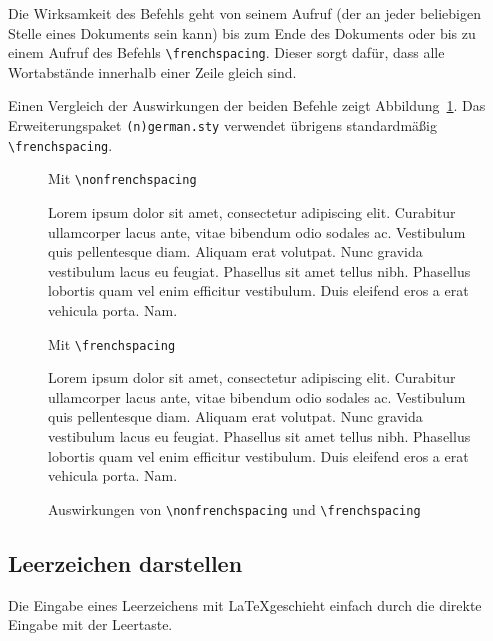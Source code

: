 \documentclass[a4paper,10pt,twoside]{scrbook}
\begin{document}
Die Wirksamkeit des Befehls geht von seinem Aufruf (der an jeder beliebigen Stelle eines Dokuments sein kann) bis zum Ende des Dokuments oder bis zu einem 
Aufruf des Befehls \verb!\frenchspacing!. Dieser sorgt 
dafür, dass alle Wortabstände innerhalb einer Zeile gleich sind. 


Einen Vergleich der Auswirkungen der beiden Befehle zeigt Abbildung~\ref{Abbildungen_frenchspacing_nonfrenchspacing}.
Das Erweiterungspaket \verb!(n)german.sty! verwendet übrigens standardmäßig \verb!\frenchspacing!.

\begin{figure}[H]
\begin{minipage}[t]{0.48\textwidth}
\setlength{\parskip}{1em}
Mit \verb!\nonfrenchspacing!

\nonfrenchspacing 
Lorem ipsum dolor sit amet, consectetur adipiscing elit. Curabitur ullamcorper lacus ante, vitae bibendum odio sodales ac. Vestibulum quis pellentesque diam. Aliquam erat volutpat. Nunc gravida vestibulum lacus eu feugiat. Phasellus sit amet tellus nibh. Phasellus lobortis quam vel enim efficitur vestibulum. Duis eleifend eros a erat vehicula porta. Nam.
\end{minipage}
\hfill
\begin{minipage}[t]{0.48\textwidth}
\setlength{\parskip}{1em}
Mit \verb!\frenchspacing!

\frenchspacing
Lorem ipsum dolor sit amet, consectetur adipiscing elit. Curabitur ullamcorper lacus ante, vitae bibendum odio sodales ac. Vestibulum quis pellentesque diam. Aliquam erat volutpat. Nunc gravida vestibulum lacus eu feugiat. Phasellus sit amet tellus nibh. Phasellus lobortis quam vel enim efficitur vestibulum. Duis eleifend eros a erat vehicula porta. Nam.
\end{minipage}
\caption{Auswirkungen von \texttt{\textbackslash nonfrenchspacing} und \texttt{\textbackslash frenchspacing}}
\label{Abbildungen_frenchspacing_nonfrenchspacing}
\end{figure}


\subsection{Leerzeichen darstellen}

Die Eingabe eines Leerzeichens mit \LaTeX geschieht einfach durch die 
direkte Eingabe mit der Leertaste. 
\end{document}
